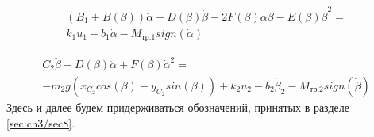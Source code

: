 \begin{equation}%
\label{eq:p3:50}
\begin{multlined}
\left( B_{1}+B \left( \beta \right) \right) \ddot \alpha -D \left( \beta \right) \ddot \beta -2F \left( \beta \right) \dot \alpha \dot \beta -E \left( \beta \right) \dot \beta ^{2}=\\
k_{1}u_{1}-b_{1} \dot \alpha -M_{\textit{тр.1}}sign \left( \dot \alpha \right) 
\end{multlined}
\end{equation}

\begin{equation}%
\label{eq:p3:51}
\begin{multlined}
C_{2} \ddot \beta -D \left( \beta \right) \ddot \alpha +F \left( \beta \right) \dot \alpha ^{2}=\\
-m_{2}g \left( 
x_{C_{2}}cos \left( \beta \right) -
y_{C_{2}}sin \left( \beta \right) 
\right) 
+k_{2}u_{2}-
b_{2} \dot \beta _{2}-M_{\textit{тр.2}}sign \left( \dot \beta \right) 
\end{multlined}
\end{equation}
Здесь и далее будем придерживаться обозначений, принятых в разделе \ref{sec:ch3/sec8}. 

